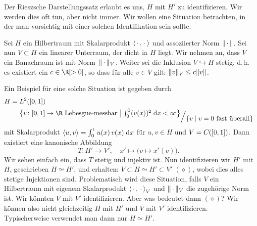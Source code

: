 \begin{thEmpty}
    Der Rieszsche Darstellungssatz erlaubt es uns, $H$ mit $H'$ zu identifizieren.
    Wir werden dies oft tun, aber nicht immer. Wir wollen eine Situation betrachten,
    in der man vorsichtig mit einer solchen Identifikation sein sollte:
    
    Sei $H$ ein Hilbertraum mit Skalarprodukt $\left\langle\,\cdot\,,\,\cdot\,\right\rangle$ und assoziierter Norm
    $\lVert\,\cdot\,\rVert$. Sei nun $V\subset H$ ein linearer Unterraum, der dicht in $H$
    liegt. Wir nehmen an, dass $V$ ein Banachraum ist mit Norm~$\lVert\,\cdot\,\rVert_V$.
    Weiter sei die Inklusion $V\hookrightarrow H$ stetig, d.\,h. es existiert
    ein $c\in\R[>0]$, so dass für alle $v\in V$ gilt: $\lVert v\rVert_V \leq
    c\lVert v\rVert$.
    
    Ein Beispiel für eine solche Situation ist gegeben durch
    \begin{align*}
        H 
        &= L^2(\I) 
        \\
        &= \bigl\{ v\colon\I\to\R \text{ Lebesgue-messbar} \cMid\big
        {\textstyle\int_0^1 (v(x))^2 \dif{x}} < \infty \bigr\}
        \raisebox{-5pt}{$\displaystyle\Big/ 
            \raisebox{-3pt}{$\displaystyle
                \{ v \Mid v = 0 \text{ fast überall} \} 
            $}
        $}
    \end{align*}
    mit Skalarprodukt $\left\langle u,v\right\rangle = \int_0^1 u(x)\,v(x)\;\mathrm{d} x$ für $u,v\in H$
    und $V=C([0,1])$.
    Dann existiert eine kanonische Abbildung
    \[ T\colon H' \to V', \quad x'\mapsto \bigl(v\mapsto x'(v)\bigr)  . \]
    Wir sehen einfach ein, dass $T$ stetig und injektiv ist.
    Nun identifizieren wir $H'$ mit $H$, geschrieben $H\simeq H'$, und erhalten:
    $V\subset H \simeq H' \subset V' \;(\diamond)$, wobei dies alles stetige Injektionen
    sind. Problematisch wird diese Situation, falls $V$ ein Hilbertraum mit
    eigenem Skalarprodukt $\left\langle\,\cdot\,,\,\cdot\,\right\rangle_V$ und $\lVert\,\cdot\,\rVert_V$ die zugehörige
    Norm ist. Wir könnten $V$ mit $V'$ identifizieren. Aber was bedeutet dann
    $(\diamond)$? Wir können also nicht gleichzeitig $H$ mit $H'$ und $V$ mit $V'$
    identifizieren. Typischerweise verwendet man dann nur $H\simeq H'$.
\end{thEmpty}
